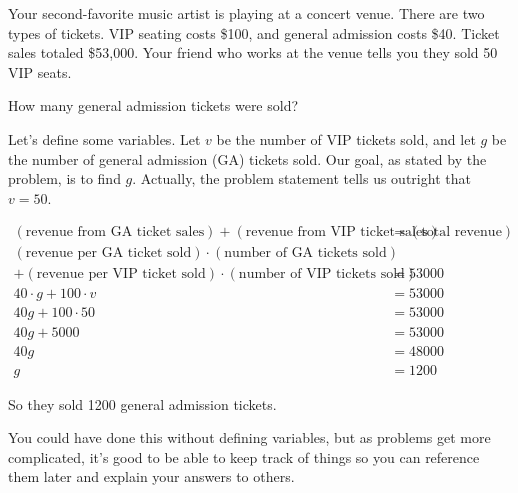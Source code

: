 \documentclass[noauthor]{ximera}
\begin{document}
\begin{problem}
Your second-favorite music artist is playing at a concert venue. There are two types of tickets. VIP seating costs \$100, and general admission costs \$40. 
Ticket sales totaled \$53,000. Your friend who works at the venue tells you they sold 50 VIP seats.

How many general admission tickets were sold?


\begin{explanation}
Let's define some variables. Let \(v\) be the number of VIP tickets sold, and let \(g\) be the number of general admission (GA)
tickets sold. Our goal, as stated by the problem, is to find \(g\). Actually, the problem statement tells us outright that \(v = 50\).

\begin{align*}
    (\text{revenue from GA ticket sales}) + (\text{revenue from VIP ticket sales}) & = (\text{total revenue}) \\
     (\text{revenue per GA ticket sold}) \cdot (\text{number of GA tickets sold}) & \\ + (\text{revenue per VIP ticket sold}) \cdot (\text{number of VIP tickets sold}) & = 53000 \\
    40 \cdot g + 100 \cdot v & = 53000 \\
    40g + 100 \cdot 50 & = 53000 \\
    40g +5000 & = 53000 \\
    40g & = 48000 \\
    g & = 1200
\end{align*}

So they sold 1200 general admission tickets.

You could have done this without defining variables, but as problems get more complicated, it's good to be able to keep
track of things so you can reference them later and explain your answers to others.
\end{explanation}
\end{problem}
\end{document}
